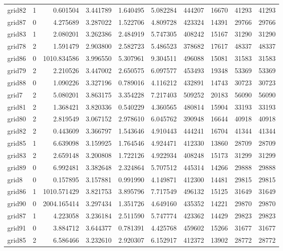 \begin{longtable}{|l|r|r|r|r|r|r|r|r|r|}
grid82 & 1 & 0.601504 & 3.441789 & 1.640495 & 5.082284 & 444207 & 16670 & 41293 & 41293 \\
grid87 & 0 & 4.275689 & 3.287022 & 1.522706 & 4.809728 & 423324 & 14391 & 29766 & 29766 \\
grid83 & 1 & 2.080201 & 3.262386 & 2.484919 & 5.747305 & 408242 & 15167 & 31290 & 31290 \\
grid78 & 2 & 1.591479 & 2.903800 & 2.582723 & 5.486523 & 378682 & 17617 & 48337 & 48337 \\
grid86 & 0 & 1010.834586 & 3.996550 & 5.307961 & 9.304511 & 496088 & 15081 & 31583 & 31583 \\
grid79 & 2 & 2.210526 & 3.447002 & 2.650575 & 6.097577 & 453493 & 19348 & 53369 & 53369 \\
grid88 & 0 & 1.090226 & 3.327196 & 0.789016 & 4.116212 & 432891 & 14743 & 30723 & 30723 \\
grid7 & 2 & 5.080201 & 3.863175 & 3.354228 & 7.217403 & 509252 & 20183 & 56090 & 56090 \\
grid81 & 2 & 1.368421 & 3.820336 & 0.540229 & 4.360565 & 480814 & 15904 & 33193 & 33193 \\
grid80 & 2 & 2.819549 & 3.067152 & 2.978610 & 6.045762 & 390948 & 16644 & 40918 & 40918 \\
grid82 & 2 & 0.443609 & 3.366797 & 1.543646 & 4.910443 & 444241 & 16704 & 41344 & 41344 \\
grid85 & 1 & 6.639098 & 3.159925 & 1.764546 & 4.924471 & 412330 & 13860 & 28709 & 28709 \\
grid83 & 2 & 2.659148 & 3.200808 & 1.722126 & 4.922934 & 408248 & 15173 & 31299 & 31299 \\
grid89 & 0 & 6.992481 & 3.382648 & 2.324864 & 5.707512 & 445314 & 14266 & 29888 & 29888 \\
grid8 & 0 & 0.157895 & 3.157881 & 0.991990 & 4.149871 & 412300 & 14481 & 29815 & 29815 \\
grid86 & 1 & 1010.571429 & 3.821753 & 3.895796 & 7.717549 & 496132 & 15125 & 31649 & 31649 \\
grid90 & 0 & 2004.165414 & 3.297434 & 1.351726 & 4.649160 & 435352 & 14221 & 29870 & 29870 \\
grid87 & 1 & 4.223058 & 3.236184 & 2.511590 & 5.747774 & 423362 & 14429 & 29823 & 29823 \\
grid91 & 0 & 3.884712 & 3.644377 & 0.781391 & 4.425768 & 459602 & 15266 & 31677 & 31677 \\
grid85 & 2 & 6.586466 & 3.232610 & 2.920307 & 6.152917 & 412372 & 13902 & 28772 & 28772 \\

\end{longtable}
